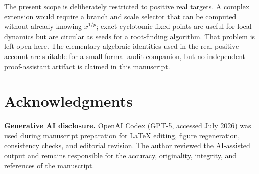 \documentclass[10pt,a4paper]{article}
\theoremstyle{plain}
\theoremstyle{definition}
\theoremstyle{remark}
\begin{document}
The present scope is deliberately restricted to positive real targets.  A
complex extension would require a branch and scale selector that can be computed
without already knowing $x^{1/p}$; exact cyclotomic fixed points are useful for
local dynamics but are circular as seeds for a root-finding algorithm.  That
problem is left open here.  The elementary algebraic identities used in the
real-positive account are suitable for a small formal-audit companion, but no
independent proof-assistant artifact is claimed in this manuscript.

\section*{Acknowledgments}

\textbf{Generative AI disclosure.}
OpenAI Codex (GPT-5, accessed July 2026) was used during manuscript preparation
for LaTeX editing, figure regeneration, consistency checks, and editorial
revision.  The author reviewed the AI-assisted output and remains responsible
for the accuracy, originality, integrity, and references of the manuscript.
\end{document}

